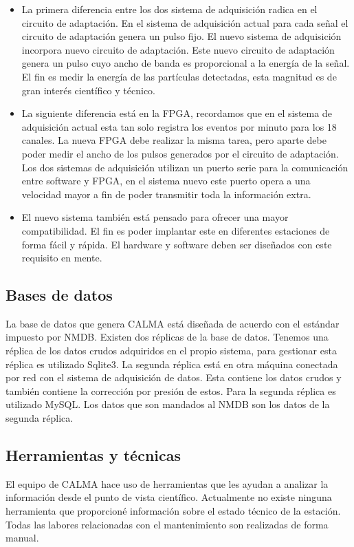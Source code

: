 		\begin{itemize}
			\item La primera diferencia entre los dos sistema de adquisición radica en el circuito de adaptación. En el sistema de
			  adquisición actual para cada señal el circuito de adaptación genera un pulso fijo. El nuevo sistema de adquisición incorpora
			  nuevo circuito de adaptación. Este nuevo circuito de adaptación genera un pulso cuyo ancho de banda es proporcional a la
			  energía de la señal. El fin es medir la energía de las partículas detectadas, esta magnitud es de gran interés científico y
			  técnico.
			\item La siguiente diferencia está en la FPGA, recordamos que en el sistema de adquisición actual esta tan solo registra los
			  eventos por minuto para los 18 canales. La nueva FPGA debe realizar la misma tarea, pero aparte debe poder medir el ancho de
			  los pulsos generados por el circuito de adaptación. Los dos sistemas de adquisición utilizan un puerto serie para la
			  comunicación entre software y FPGA, en el sistema nuevo este puerto opera a una velocidad mayor a fin de poder transmitir
			  toda la información extra.
			\item El nuevo sistema también está pensado para ofrecer una mayor compatibilidad. El fin es poder implantar este en
			  diferentes estaciones de forma fácil y rápida. El hardware y software deben ser diseñados con este requisito en mente.
		\end{itemize}
	\subsection{Bases de datos}
		La base de datos que genera CALMA está diseñada de acuerdo con el estándar impuesto por NMDB. Existen dos réplicas de la
		base de datos. Tenemos una réplica de los datos crudos adquiridos en el propio sistema, para gestionar esta réplica es utilizado
		Sqlite3. La segunda réplica está en otra máquina conectada por red con el sistema de adquisición de datos. Esta contiene los datos
		crudos y también contiene la corrección por presión de estos. Para la segunda réplica es utilizado MySQL. Los datos que son mandados
		al NMDB son los datos de la segunda réplica.
	\subsection{Herramientas y técnicas}
		El equipo de CALMA hace uso de herramientas que les ayudan a analizar la información desde el punto de vista científico.  Actualmente
		no existe ninguna herramienta que proporcioné información sobre el estado técnico de la estación. Todas las labores relacionadas con
		el mantenimiento son realizadas de forma manual.

